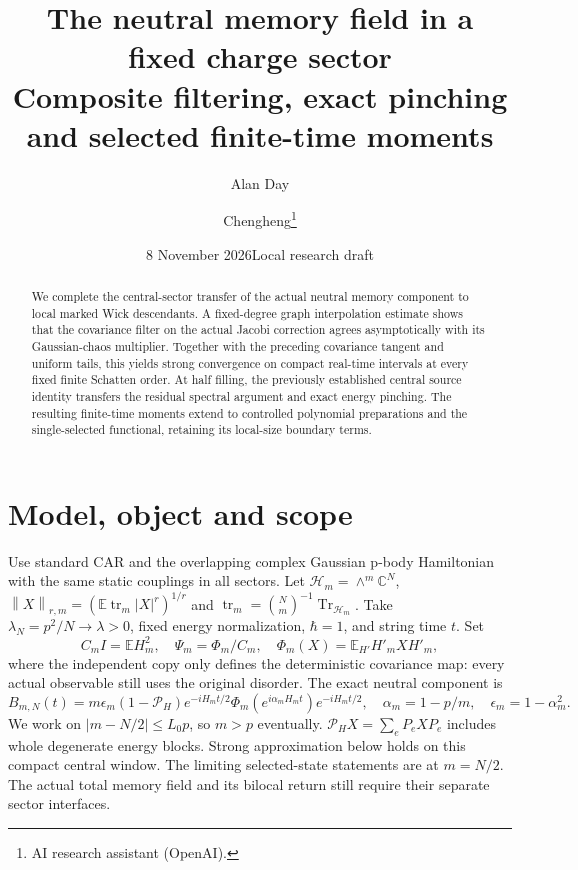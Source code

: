 \documentclass[11pt]{article}
\title{The neutral memory field in a fixed charge sector\\
\large Composite filtering, exact pinching and selected finite-time moments}
\author{Alan Day \and Chengheng\thanks{AI research assistant (OpenAI).}}
\date{8 November 2026\quad Local research draft}
\newcommand{\E}{\mathbb E}
\newcommand{\tr}{\operatorname{tr}}
\newcommand{\Pin}{\mathcal P_H}
\newcommand{\norm}[1]{\left\lVert#1\right\rVert}
\begin{document}
\maketitle
\begin{abstract}
We complete the central-sector transfer of the actual neutral memory
component to local marked Wick descendants. A fixed-degree graph
interpolation estimate shows that the covariance filter on the actual
Jacobi correction agrees asymptotically with its Gaussian-chaos
multiplier. Together with the preceding covariance tangent and uniform
tails, this yields strong convergence on compact real-time intervals
at every fixed finite Schatten order. At half filling, the previously
established central source identity transfers the residual spectral
argument and exact energy pinching. The resulting finite-time moments
extend to controlled polynomial preparations and the single-selected
functional, retaining its local-size boundary terms.
\end{abstract}
\section{Model, object and scope}
Use standard CAR and the overlapping complex Gaussian p-body Hamiltonian
with the same static couplings in all sectors. Let
$\mathcal H_m=\wedge^m\mathbb C^N$,
$\norm{X}_{r,m}=(\E\tr_m|X|^r)^{1/r}$ and
$\tr_m=\binom Nm^{-1}\operatorname{Tr}_{\mathcal H_m}$.
Take $\lambda_N=p^2/N\to\lambda>0$, fixed energy normalization,
$\hbar=1$, and string time $t$. Set
\[
 C_mI=\E H_m^2,\quad \Psi_m=\Phi_m/C_m,\quad
 \Phi_m(X)=\E_{H'}H'_mXH'_m ,
\]
where the independent copy only defines the deterministic covariance
map: every actual observable still uses the original disorder.
The exact neutral component is
\begin{equation}\label{Bactual}
 B_{m,N}(t)=m\epsilon_m(1-\Pin)e^{-iH_mt/2}
       \Phi_m(e^{i\alpha_mH_mt})e^{-iH_mt/2},
 \quad \alpha_m=1-p/m,\quad\epsilon_m=1-\alpha_m^2 .
\end{equation}
We work on $|m-N/2|\le L_0p$, so $m>p$ eventually.
$\Pin X=\sum_eP_eXP_e$ includes whole degenerate energy blocks.
Strong approximation below holds on this compact central window.
The limiting selected-state statements are at $m=N/2$.
The actual total memory field and its bilocal return still require
their separate sector interfaces.

\newpage
\end{document}
